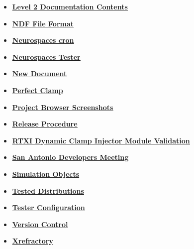 \documentclass[12pt]{article}
\begin{document}
\begin{itemize}
\item \href{../contents-level2/contents-level2.pdf}{\bf \underline{Level 2 Documentation Contents}}

\item \href{../ndf-file-format/ndf-file-format.pdf}{\bf \underline{NDF File Format}}

\item \href{../neurospaces-cron/neurospaces-cron.pdf}{\bf \underline{Neurospaces cron}}

\item \href{../neurospaces-tester/neurospaces-tester.pdf}{\bf \underline{Neurospaces Tester}}

\item \href{../NewDocument/NewDocument.pdf}{\bf \underline{New Document}}

\item \href{../pclamp/pclamp.pdf}{\bf \underline{Perfect Clamp}}

\item \href{../project-browser-screenshots/project-browser-screenshots.pdf}{\bf \underline{Project Browser Screenshots}}

\item \href{../release-procedure/release-procedure.pdf}{\bf \underline{Release Procedure}}

\item \href{../rtxi-injector-validation/rtxi-injector-validation.pdf}{\bf \underline{RTXI Dynamic Clamp Injector Module Validation}}

\item \href{../san-antonio-1/san-antonio-1.pdf}{\bf \underline{San Antonio Developers Meeting}}

\item \href{../simulation-objects/simulation-objects.pdf}{\bf \underline{Simulation Objects}}

\item \href{../tested-distributions/tested-distributions.pdf}{\bf \underline{Tested Distributions}}

\item \href{../tester-configuration/tester-configuration.pdf}{\bf \underline{Tester Configuration}}

\item \href{../version-control/version-control.pdf}{\bf \underline{Version Control}}

\item \href{../cxref/cxref.pdf}{\bf \underline{Xrefractory}}


\end{itemize}

\end{document}
